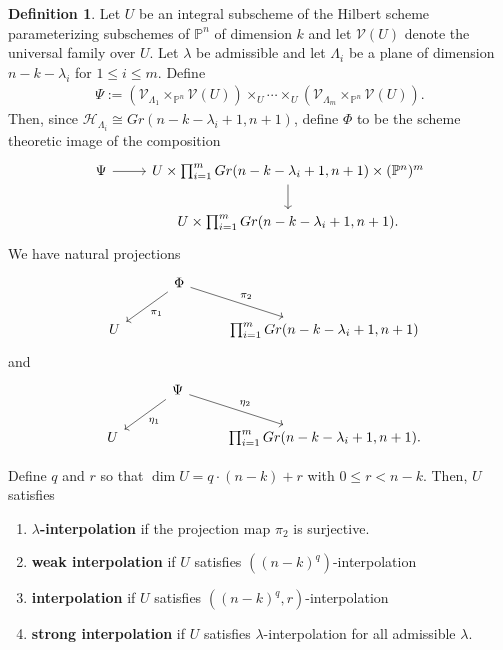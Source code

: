 \documentclass[reqno, 11pt]{amsart}
\theoremstyle{definition}
\theoremstyle{remark}
\numberwithin{equation}{section}
\numberwithin{thm}{section}
\numberwithin{prop}{section}
\numberwithin{lem}{section}
\numberwithin{cor}{section}
\numberwithin{conj}{section}
\numberwithin{defn}{section}
\theoremstyle{plain}
\theoremstyle{definition}
\newtheorem{definition}[theorem]{Definition}
\newcommand\bp{{\mathbb P}}
\newcommand\sch{\mathscr H}
\newcommand\scv{\mathscr V}
\newcommand \hilb[1]{\sch_{#1}}
\newcommand \uhilb[1]{\scv_{#1}}
\begin{document}
\begin{definition}
	\label{definition:interpolation}	
	Let $U$ be an integral subscheme of the Hilbert scheme
	parameterizing subschemes of $\bp^n$ of dimension $k$
	and let $\scv(U)$ denote the universal family over $U$.
	Let $\lambda$ be admissible and let 
	$\Lambda_i$ be a plane of dimension $n - k - \lambda_i$ for $1 \leq i \leq m$.
Define
\begin{align*}
	\Psi := \left( \uhilb {\Lambda_1} \times_{\bp^n} \scv(U) \right) \times_{U} \cdots \times_{U} \left( \uhilb {\Lambda_m} \times_{\bp^n} \scv(U) \right).
\end{align*}
Then, since $\hilb {\Lambda_i} \cong Gr(n- k - \lambda_i + 1, n+1)$, define $\Phi$ to be the scheme theoretic image of the composition
\begin{equation}
	\nonumber
	\begin{tikzcd} 
	  \Psi \ar{r} & U \times \prod_{i=1}^m Gr(n - k - \lambda_i + 1, n + 1) \times (\bp^n)^m \ar{d} \\
		 & U \times \prod_{i=1}^m Gr(n - k - \lambda_i + 1, n + 1).
	\end{tikzcd}\end{equation}
We have natural projections
\begin{equation}
	\nonumber
	\begin{tikzcd}
		\qquad & \Phi \ar {ld}{\pi_1} \ar {rd}{\pi_2} & \\
		U  &&  \prod_{i=1}^m Gr(n - k - \lambda_i +1, n+1)
	 \end{tikzcd}\end{equation}
and
\begin{equation}
	\nonumber
	\begin{tikzcd}
		\qquad & \Psi \ar {ld}{\eta_1} \ar {rd}{\eta_2} & \\
		U  &&  \prod_{i=1}^m Gr(n - k - \lambda_i +1, n+1).
	 \end{tikzcd}\end{equation}

Define $q$ and $r$ so that $\dim U = q \cdot(n-k) + r$ with $0 \leq r < n - k$. Then,
$U$ satisfies
\begin{enumerate}
	\item {\bf $\lambda$-interpolation}
if the projection map $\pi_2$ is surjective.
	\item {\bf weak interpolation} if $U$ satisfies $((n - k)^q)$-interpolation
	\item {\bf interpolation} if $U$ satisfies $((n - k)^q, r)$-interpolation
	\item {\bf strong interpolation}
if $U$ satisfies $\lambda$-interpolation for all admissible $\lambda$.
\end{enumerate}


\end{definition}
\end{document}
